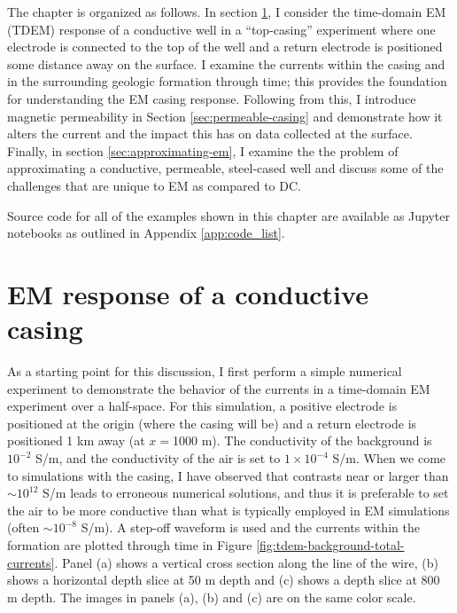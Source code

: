 The chapter is organized as follows. In section \ref{sec:TDEM-casing}, I consider the time-domain EM (TDEM) response of a conductive well in a ``top-casing'' experiment where one electrode is connected to the top of the well and a return electrode is positioned some distance away on the surface. I examine the currents within the casing and in the surrounding geologic formation through time; this provides the foundation for understanding the EM casing response. Following from this, I introduce magnetic permeability in Section \ref{sec:permeable-casing} and demonstrate how it alters the current and the impact this has on data collected at the surface. Finally, in section \ref{sec:approximating-em}, I examine the the problem of approximating a conductive, permeable, steel-cased well and discuss some of the challenges that are unique to EM as compared to DC.

Source code for all of the examples shown in this chapter are available as Jupyter notebooks as outlined in Appendix \ref{app:code_list}.


\section{EM response of a conductive casing}
\label{sec:TDEM-casing}

As a starting point for this discussion, I first perform a simple numerical experiment to demonstrate the behavior of the currents in a time-domain EM experiment over a half-space. For this simulation, a positive electrode is positioned at the origin (where the casing will be)  and a return electrode is positioned 1 km away (at $x=$1000 m). The conductivity of the background is $10^{-2}$ S/m, and the conductivity of the air is set to $1 \times 10^{-4}$ S/m. When we come to simulations with the casing, I have observed that contrasts near or larger than $\sim 10^{12}$ S/m leads to erroneous numerical solutions, and thus it is preferable to set the air to be more conductive than what is typically employed in EM simulations (often $\sim 10^{-8}$ S/m). A step-off waveform is used and the currents within the formation are plotted through time in Figure \ref{fig:tdem-background-total-currents}. Panel (a) shows a vertical cross section along the line of the wire, (b) shows a horizontal depth slice at 50 m depth and (c) shows a depth slice at 800 m depth. The images in panels (a), (b) and (c) are on the same color scale.





